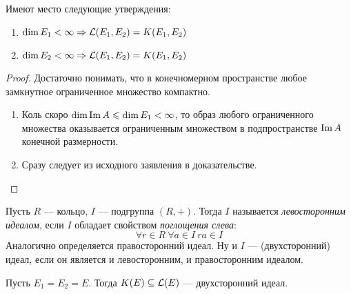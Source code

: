 \begin{proposition}
	Имеют место следующие утверждения:
	\begin{enumerate}
		\item $\dim E_1 < \infty \Rightarrow \mathcal{L}(E_1, E_2) = K(E_1, E_2)$
		
		\item $\dim E_2 < \infty \Rightarrow \mathcal{L}(E_1, E_2) = K(E_1, E_2)$
	\end{enumerate}
\end{proposition}

\begin{proof}
	Достаточно понимать, что в конечномерном пространстве любое замкнутное ограниченное множество компактно.
	\begin{enumerate}
		\item Коль скоро $\dim \operatorname{Im} A \leqslant \dim E_1 < \infty$, то образ любого ограниченного множества оказывается ограниченным множеством в подпространстве $\operatorname{Im} A$ конечной размерности.
		
		\item Сразу следует из исходного заявления в доказательстве.
	\end{enumerate}
\end{proof}

\begin{reminder}
	Пусть $R$ --- кольцо, $I$ --- подгруппа $(R, +)$. Тогда $I$ называется \textit{левосторонним идеалом}, если $I$ обладает свойством \textit{поглощения слева}:
	\[
		\forall r \in R\ \forall a \in I\ ra \in I
	\]
	Аналогично определяется правосторонний идеал. Ну и $I$ --- (двухсторонний) идеал, если он является и левосторонним, и правосторонним идеалом.
\end{reminder}

\begin{proposition}
	Пусть $E_1 = E_2 = E$. Тогда $K(E) \subseteq \mathcal{L}(E)$ --- двухсторонний идеал.
\end{proposition}

